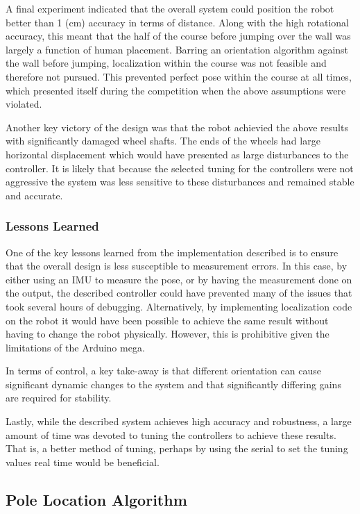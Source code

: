 \documentclass[ece]{uw-wkrpt}
\begin{document}
A final experiment indicated that the overall system could position the robot better than 1 (cm) accuracy in terms of distance. Along with the high rotational accuracy, this meant that the half of the course before jumping over the wall was largely a function of human placement. Barring an orientation algorithm against the wall before jumping, localization within the course was not feasible and therefore not pursued. This prevented perfect pose within the course at all times, which presented itself during the competition when the above assumptions were violated. 

Another key victory of the design was that the robot achievied the above results with significantly damaged wheel shafts. The ends of the wheels had large horizontal displacement which would have presented as large disturbances to the controller. It is likely that because the selected tuning for the controllers were not aggressive the system was less sensitive to these disturbances and remained stable and accurate.

\subsubsection{Lessons Learned}

One of the key lessons learned from the implementation described is to ensure that the overall design is less susceptible to measurement errors. In this case, by either using an IMU to measure the pose, or by having the measurement done on the output, the described controller could have prevented many of the issues that took several hours of debugging. Alternatively, by implementing localization code on the robot it would have been possible to achieve the same result without having to change the robot physically. However, this is prohibitive given the limitations of the Arduino mega. 

In terms of control, a key take-away is that different orientation can cause significant dynamic changes to the system and that significantly differing gains are required for stability. 

Lastly, while the described system achieves high accuracy and robustness, a large amount of time was devoted to tuning the controllers to achieve these results. That is, a better method of tuning, perhaps by using the serial to set the tuning values real time would be beneficial. 

\subsection{Pole Location Algorithm}
\end{document}
